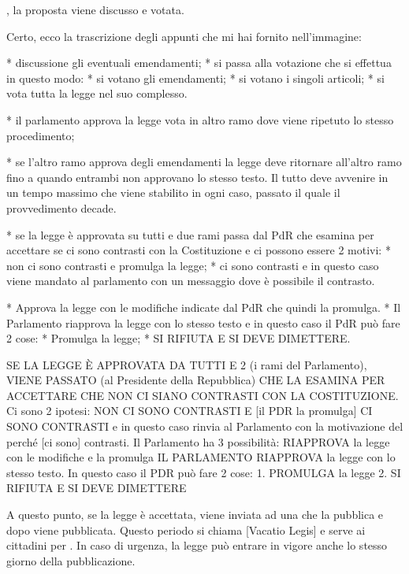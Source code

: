 \documentclass[letterpaper,10pt,italian]{sphinxmanual}
\begin{document}
\sphinxAtStartPar
{}, la proposta viene discusso e votata.

\sphinxAtStartPar
Certo, ecco la trascrizione degli appunti che mi hai fornito nell’immagine:

\sphinxAtStartPar
{}
* discussione gli eventuali emendamenti;
* si passa alla votazione che si effettua in questo modo:
* si votano gli emendamenti;
* si votano i singoli articoli;
* si vota tutta la legge nel suo complesso.

\sphinxAtStartPar
{}
* il parlamento approva la legge vota in altro ramo dove viene ripetuto lo stesso procedimento;

\sphinxAtStartPar
{}
* se l’altro ramo approva degli emendamenti la legge deve ritornare all’altro ramo fino a quando entrambi non approvano lo stesso testo. Il tutto deve avvenire in un tempo massimo che viene stabilito in ogni caso, passato il quale il provvedimento decade.

\sphinxAtStartPar
{}
* se la legge è approvata su tutti e due rami passa dal PdR che esamina per accettare se ci sono contrasti con la Costituzione e ci possono essere 2 motivi:
* non ci sono contrasti e promulga la legge;
* ci sono contrasti e in questo caso viene mandato al parlamento con un messaggio dove è possibile il contrasto.

\sphinxAtStartPar
{}
* Approva la legge con le modifiche indicate dal PdR che quindi la promulga.
* Il Parlamento riapprova la legge con lo stesso testo e in questo caso il PdR può fare 2 cose:
* Promulga la legge;
* SI RIFIUTA E SI DEVE DIMETTERE.

\sphinxAtStartPar
{} SE LA LEGGE È APPROVATA DA TUTTI E 2 (i rami del Parlamento), VIENE PASSATO
(al Presidente della Repubblica) CHE LA ESAMINA PER ACCETTARE CHE NON CI SIANO CONTRASTI CON LA COSTITUZIONE.
Ci sono 2 ipotesi:
\sphinxhyphen{} NON CI SONO CONTRASTI E {[}il PDR la promulga{]}
\sphinxhyphen{} CI SONO CONTRASTI e in questo caso rinvia al Parlamento con la motivazione del perché {[}ci sono{]} contrasti.
Il Parlamento ha 3 possibilità:
\sphinxhyphen{} RIAPPROVA la legge con le modifiche e la promulga
\sphinxhyphen{} IL PARLAMENTO RIAPPROVA la legge con lo stesso testo. In questo caso il PDR può fare 2 cose:
1. PROMULGA la legge
2. SI RIFIUTA E SI DEVE DIMETTERE

\sphinxAtStartPar
A questo punto, se la legge è accettata, viene inviata ad una  che la pubblica e dopo  viene pubblicata. Questo periodo si chiama {[}Vacatio Legis{]} e serve ai cittadini per . In caso di urgenza, la legge può entrare in vigore anche lo stesso giorno della pubblicazione.
\end{document}
